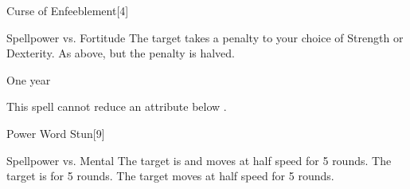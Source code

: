 \begin{spellfooter}
\begin{spellsection}{Curse of Enfeeblement}[4]
    \begin{spellheader}
    \end{spellheader}
    \begin{spellcontent}
        \begin{spelltargetinginfo}
        \end{spelltargetinginfo}
        \begin{spelleffects}
            \begin{spellattack}{Spellpower vs. Fortitude}
                \spellsuccess The target takes a  penalty to your choice of Strength or Dexterity.
                \spellfailure As above, but the penalty is halved.
            \end{spellattack}
            \spelldur One year
        \end{spelleffects}
    \end{spellcontent}
    \begin{spellfooter}
        \spellnotes This spell cannot reduce an attribute below . \cursespellnotes
        \miscastrandom
    \end{spellfooter}
\end{spellsection}

\begin{spellsection}{Power Word Stun}[9]
    \begin{spellheader}
    \end{spellheader}
    \begin{spellcontent}
        \begin{spelltargetinginfo}
        \end{spelltargetinginfo}
        \begin{spelleffects}
            \begin{spellattack}{Spellpower vs. Mental}
                \spellsuccess The target is \dazed and moves at half speed for 5 rounds.
                \spellcritical The target is \stunned for 5 rounds.
                \spellfailure The target moves at half speed for 5 rounds.
            \end{spellattack}
        \end{spelleffects}
    \end{spellcontent}
    \begin{spellfooter}
        \miscastrandom
    \end{spellfooter}
\end{spellsection}


\end{spellfooter}
